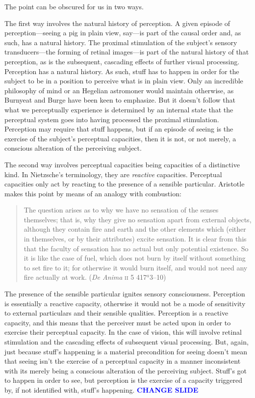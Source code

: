 \documentclass[12pt]{article}
\newcommand{\change}{\textcolor{blue}{\textbf{CHANGE SLIDE}}}
\begin{document}
The point can be obscured for us in two ways.

The first way involves the natural history of perception. A given episode of perception---seeing a pig in plain view, say---is part of the causal order and, as such, has a natural history. The proximal stimulation of the subject's sensory transducers---the forming of retinal images---is part of the natural history of that perception, as is the subsequent, cascading effects of further visual processing. Perception has a natural history. As such, stuff has to happen in order for the subject to be in a position to perceive what is in plain view. Only an incredible philosophy of mind or an Hegelian astromoner would maintain otherwise, as Burnyeat and Burge have been keen to emphasize. But it doesn't follow that what we perceptually experience is determined by an internal state that the perceptual system goes into having processed the proximal stimulation. Perception may require that stuff happens, but if an episode of seeing is the exercise of the subject's perceptual capacities, then it is not, or not merely, a conscious alteration of the perceiving subject.

The second way involves perceptual capacities being capacities of a distinctive kind. In Nietzsche's terminology, they are \emph{reactive} capacities. Perceptual capacities only act by reacting to the presence of a sensible particular. Aristotle makes this point by means of an analogy with combustion:
\begin{quote}
	The question arises as to why we have no sensation of the senses themselves; that is, why they give no sensation apart from external objects, although they contain fire and earth and the other elements which (either in themselves, or by their attributes) excite sensation. It is clear from this that the faculty of sensation has no actual but only potential existence. So it is like the case of fuel, which does not burn by itself without something to set fire to it; for otherwise it would burn itself, and would not need any fire actually at work. (\emph{De Anima} \textsc{ii} 5 417\( ^{a} \)3--10)
\end{quote}
The presence of the sensible particular ignites sensory consciousness. Perception is essentially a reactive capacity, otherwise it would not be a mode of sensitivity to external particulars and their sensible qualities. Perception is a reactive capacity, and this means that the perceiver must be acted upon in order to exercise their perceptual capacity. In the case of vision, this will involve retinal stimulation and the cascading effects of subsequent visual processing. But, again, just because stuff's happening is a material precondition for seeing doesn't mean that seeing isn't the exercise of a perceptual capacity in a manner inconsistent with its merely being a conscious alteration of the perceiving subject. Stuff's got to happen in order to see, but perception is the exercise of a capacity triggered by, if not identified with, stuff's happening. \change
\end{document}
